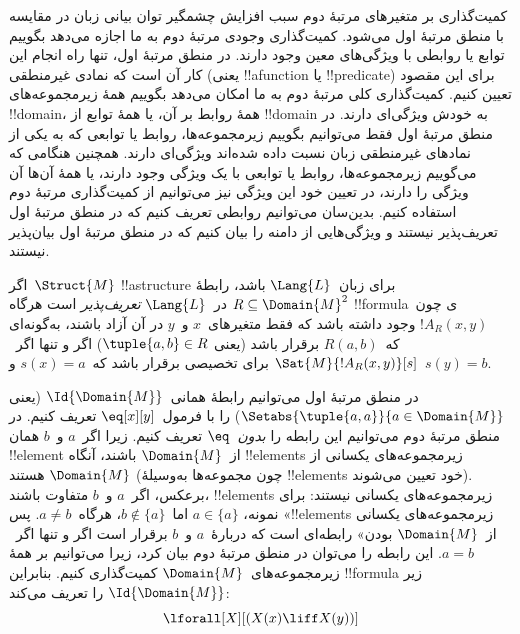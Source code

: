\documentclass[../../../include/open-logic-section]{subfiles}
\begin{document}

\begin{explain}
کمیت‌گذاری بر متغیرهای مرتبهٔ دوم سبب افزایش چشمگیر توان بیانی زبان در
مقایسه با منطق مرتبهٔ اول می‌شود. کمیت‌گذاری وجودی مرتبهٔ دوم به ما
اجازه می‌دهد بگوییم توابع یا روابطی با ویژگی‌های معین وجود دارند. در
منطق مرتبهٔ اول، تنها راه انجام این کار آن است که نمادی غیرمنطقی (یعنی
!!a{function} یا !!{predicate}) برای این مقصود تعیین کنیم. کمیت‌گذاری
کلی مرتبهٔ دوم به ما امکان می‌دهد بگوییم همهٔ زیرمجموعه‌های !!{domain}،
همهٔ روابط بر آن، یا همهٔ توابع از !!{domain} به خودش ویژگی‌ای دارند.
در منطق مرتبهٔ اول فقط می‌توانیم بگوییم زیرمجموعه‌ها، روابط یا توابعی
که به یکی از نمادهای غیرمنطقی زبان نسبت داده شده‌اند ویژگی‌ای دارند.
همچنین هنگامی که می‌گوییم زیرمجموعه‌ها، روابط یا توابعی با یک ویژگی
وجود دارند، یا همهٔ آن‌ها آن ویژگی را دارند، در تعیین خود این ویژگی
نیز می‌توانیم از کمیت‌گذاری مرتبهٔ دوم استفاده کنیم. بدین‌سان می‌توانیم
روابطی تعریف کنیم که در منطق مرتبهٔ اول تعریف‌پذیر نیستند و ویژگی‌هایی
از دامنه را بیان کنیم که در منطق مرتبهٔ اول بیان‌پذیر نیستند.
\end{explain}

\begin{defn}
اگر~$\Struct{M}$ !!a{structure} برای زبان~$\Lang{L}$ باشد، رابطهٔ
$R \subseteq \Domain{M}^2$ در~$\Lang{L}$ \emph{تعریف‌پذیر} است هرگاه
!!{formula}ی چون~$!A_R(x, y)$ وجود داشته باشد که فقط متغیرهای~$x$
و~$y$ در آن آزاد باشند، به‌گونه‌ای که~$R(a, b)$ برقرار باشد (یعنی
$\tuple{a,b} \in R$) اگر و تنها اگر~$\Sat{M}{!A_R(x, y)}[s]$ برای
تخصیصی برقرار باشد که~$s(x) = a$ و~$s(y) = b$.
\end{defn}

\begin{ex}
در منطق مرتبهٔ اول می‌توانیم رابطهٔ همانی~$\Id{\Domain{M}}$ (یعنی
$\Setabs{\tuple{a,a}}{a \in \Domain{M}}$) را با فرمول~$\eq[x][y]$
تعریف کنیم. در منطق مرتبهٔ دوم می‌توانیم این رابطه را
\emph{بدون~$\eq$} تعریف کنیم. زیرا اگر~$a$ و~$b$ همان !!{element}
از~$\Domain{M}$ باشند، آنگاه !!{element}s زیرمجموعه‌های یکسانی از
$\Domain{M}$ هستند (چون مجموعه‌ها به‌وسیلهٔ !!{element}s خود تعیین
می‌شوند). برعکس، اگر~$a$ و~$b$ متفاوت باشند، !!{element}s
زیرمجموعه‌های یکسانی نیستند: برای
نمونه، $a \in \{a\}$ اما~$b \notin \{a\}$، هرگاه~$a \neq b$.
پس «!!{element}s زیرمجموعه‌های یکسانی از~$\Domain{M}$ بودن» رابطه‌ای
است که دربارهٔ~$a$ و~$b$ برقرار است اگر و تنها اگر~$a = b$. این رابطه
را می‌توان در منطق مرتبهٔ دوم بیان کرد، زیرا می‌توانیم بر همهٔ
زیرمجموعه‌های~$\Domain{M}$ کمیت‌گذاری کنیم. بنابراین !!{formula} زیر
$\Id{\Domain{M}}$ را تعریف می‌کند:
\[
\lforall[X][(X(x) \liff X(y))]
\]
\end{ex}
\end{document}
